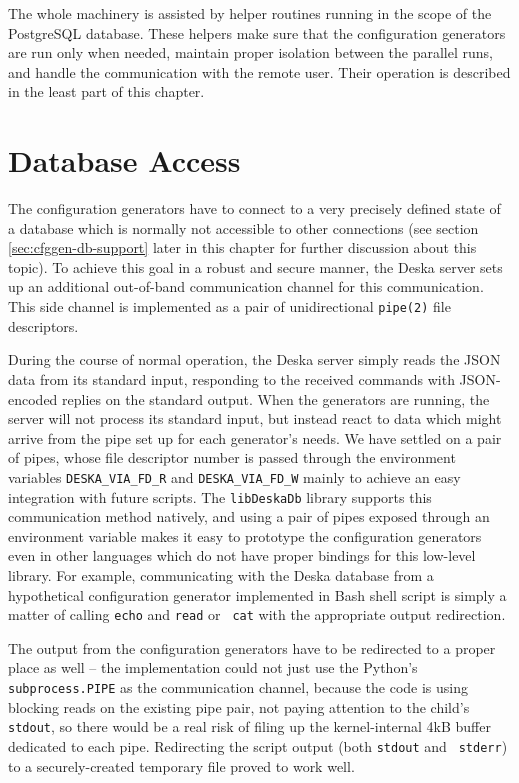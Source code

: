 \documentclass[deska]{subfiles}
\begin{document}
The whole machinery is assisted by helper routines running in the scope of the PostgreSQL database.  These helpers make
sure that the configuration generators are run only when needed, maintain proper isolation between the parallel runs,
and handle the communication with the remote user.  Their operation is described in the least part of this chapter.

\section{Database Access}
\label{sec:cfggen-pipes}

The configuration generators have to connect to a very precisely defined state of a database which is normally not
accessible to other connections (see section \ref{sec:cfggen-db-support} later in this chapter for further discussion
about this topic).  To achieve this goal in a robust and secure manner, the Deska server sets up an additional
out-of-band communication channel for this communication.  This side channel is implemented as a pair of unidirectional
{\tt pipe(2)} file descriptors.

During the course of normal operation, the Deska server simply reads the JSON data from its standard input, responding
to the received commands with JSON-encoded replies on the standard output.  When the generators are running, the server
will not process its standard input, but instead react to data which might arrive from the pipe set up for each
generator's needs.  We have settled on a pair of pipes, whose file descriptor number is passed through the environment
variables {\tt DESKA\_VIA\_FD\_R} and {\tt DESKA\_VIA\_FD\_W} mainly to achieve an easy integration with future scripts.
The {\tt libDeskaDb} library supports this communication method natively, and using a pair of pipes exposed through an
environment variable makes it easy to prototype the configuration generators even in other languages which do not have
proper bindings for this low-level library.  For example, communicating with the Deska database from a hypothetical
configuration generator implemented in Bash shell script is simply a matter of calling {\tt echo} and {\tt read} or {\tt
cat} with the appropriate output redirection.

The output from the configuration generators have to be redirected to a proper place as well -- the implementation could
not just use the Python's {\tt subprocess.PIPE} as the communication channel, because the code is using blocking reads
on the existing pipe pair, not paying attention to the child's {\tt stdout}, so there would be a real risk of filing up
the kernel-internal 4kB buffer dedicated to each pipe.  Redirecting the script output (both {\tt stdout} and {\tt
stderr}) to a securely-created temporary file proved to work well.
\end{document}
